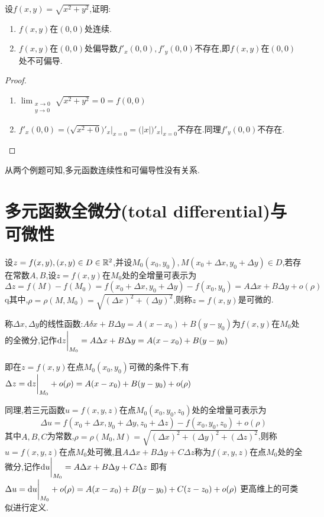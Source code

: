 \begin{example}
    设$f(x,y)=\sqrt{x^2+y^2}$,证明:\begin{enumerate}
        \item $f(x,y)$在$(0,0)$处连续.
        \item $f(x,y)$在$(0,0)$处偏导数$f'_x(0,0),f'_y(0,0)$不存在,即$f(x,y)$在$(0,0)$处不可偏导.
    \end{enumerate}
\end{example}
\begin{proof}
    \begin{enumerate}
        \item $\lim_{\substack{x\to0\\y\to0}}\sqrt{x^2+y^2}=0=f(0,0)$
        \item $f'_x(0,0)=\big(\sqrt{x^2+0}\big)'_x\bigg|_{x=0}=\big(|x|\big)'_x\bigg|_{x=0}$不存在.同理$f'_y(0,0)$不存在.
    \end{enumerate}
\end{proof}
从两个例题可知,多元函数连续性和可偏导性没有关系.

\section{多元函数全微分(total differential)与可微性}
\begin{definition}
    设$z=f(x,y),(x,y)\in D\in \mathbb{R}^2$,并设$M_0(x_0,y_0),M(x_0+\Delta x,y_0+\Delta y)\in D $,若存在常数$A,B$,设$z=f(x,y)$在$M_0$处的全增量可表示为$$\Delta z=f(M)-f(M_0)=f(x_0+\Delta x ,y_0+\Delta y)-f(x_0,y_0)=A\Delta x+B\Delta y+o(\rho)$$q其中,$\rho=\rho(M,M_0)=\sqrt{(\Delta x)^2+(\Delta y)^2}$,则称$z=f(x,y)$是可微的.
    
    称$\Delta x,\Delta y$的线性函数:$A\delta x+B\Delta y=A(x-x_0)+B(y-y_0)$为$f(x,y)$在$M_0$处的全微分,记作$\operatorname{d\!}{}z\bigg|_{M_0}=A\Delta x+B\Delta y=A(x-x_0)+B(y-y_0)$

    即在$z=f(x,y)$在点$M_0(x_0,y_0)$可微的条件下,有$\Delta z=\operatorname{d\!}{z}\bigg|_{M_0}+o(\rho)=A(x-x_0)+B(y-y_0)+o(\rho)$
\end{definition}

同理,若三元函数$u=f(x,y,z)$在点$M_0(x_0,y_0,z_0)$处的全增量可表示为
$$\Delta u=f(x_0+\Delta x,y_0+\Delta y,z_0+\Delta z)-f(x_0,y_0,z_0)+o(\rho)$$
其中$A,B,C$为常数,$\rho=\rho(M_0,M)=\sqrt{(\Delta x)^2+(\Delta y)^2+(\Delta z)^2}$,则称$u=f(x,y,z)$在点$M_0$处可微,且$A\Delta x+B\Delta y+C\Delta z$称为$f(x,y,z)$在点$M_0$处的全微分,记作$\operatorname{d\!}{}u\bigg|_{M_0}=A\Delta x+B\Delta y+C\Delta z$
即有
$\Delta u=\operatorname{d\!}{}u\bigg|_{M_0}+o(\rho)=A(x-x_0)+B(y-y_0)+C(z-z_0)+o(\rho)$
更高维上的可类似进行定义.

